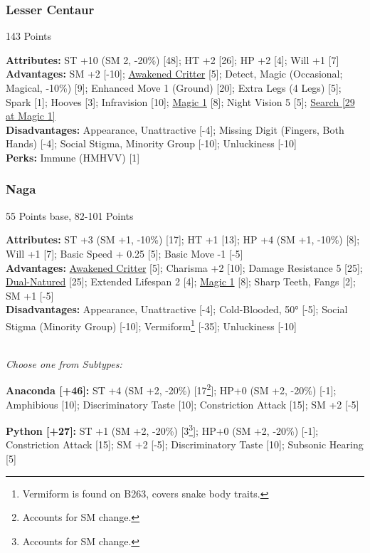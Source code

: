 \begin{multicols*}{3}
	\subsubsection*{Lesser Centaur}
	\begin{flushright}
		143 Points
	\end{flushright}
	\textbf{Attributes:}
	ST +10 (SM 2, -20\%) [48]; HT +2 [26]; HP +2 [4]; Will +1 [7]
	\\\textbf{Advantages:}
	SM +2 [-10]; \hyperref[awakened_critter]{Awakened Critter} [5]; Detect, Magic (Occasional; Magical, -10\%) [9]; Enhanced Move 1 (Ground) [20]; Extra Legs (4 Legs) [5]; Spark [1]; Hooves [3]; Infravision [10]; \hyperref[magic]{Magic 1} [8]; Night Vision 5 [5]; \hyperref[search]{Search [29 at Magic 1]}
	\\\textbf{Disadvantages:} 
	Appearance, Unattractive [-4]; Missing Digit (Fingers, Both Hands) [-4]; Social Stigma, Minority Group [-10]; Unluckiness [-10]
	\\\textbf{Perks:}
	Immune (HMHVV) [1]
	
	\subsubsection*{Naga}
	\begin{flushright}
		55 Points base, 82-101 Points
	\end{flushright}
	\textbf{Attributes:} 
	ST +3 (SM +1, -10\%) [17]; HT +1 [13]; HP +4 (SM +1, -10\%) [8]; Will +1 [7]; Basic Speed + 0.25 [5]; Basic Move -1 [-5]
	\\\textbf{Advantages:} 
	\hyperref[awakened_critter]{Awakened Critter} [5]; Charisma +2 [10]; Damage Resistance 5 [25]; \hyperref[dual_natured]{Dual-Natured} [25]; Extended Lifespan 2 [4]; \hyperref[magic]{Magic 1} [8]; Sharp Teeth, Fangs [2]; SM +1 [-5]
	\\\textbf{Disadvantages:}
	Appearance, Unattractive [-4]; Cold-Blooded, 50° [-5]; Social Stigma (Minority Group) [-10];  Vermiform\footnote{Vermiform is found on B263, covers snake body traits.} [-35]; Unluckiness [-10]
	
	\textit{\\Choose one from Subtypes:}
	
	\textbf{Anaconda [+46]:} ST +4 (SM +2, -20\%) [17\footnote{Accounts for SM change.}]; HP+0 (SM +2, -20\%) [-1]; Amphibious [10]; Discriminatory Taste [10]; Constriction Attack [15]; SM +2 [-5]
	
	\textbf{Python [+27]:} ST +1 (SM +2, -20\%) [3\footnote{Accounts for SM change.}]; HP+0 (SM +2, -20\%) [-1]; Constriction Attack [15]; SM +2 [-5]; Discriminatory Taste [10]; Subsonic Hearing [5]
		

\end{multicols*}
